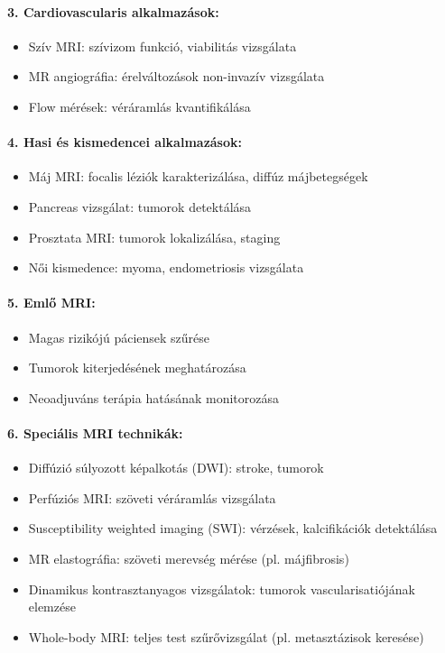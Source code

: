 \documentclass[a4paper,12pt]{article}
\begin{document}
\paragraph{3. Cardiovascularis alkalmazások:} \begin{itemize} \item Szív MRI: szívizom funkció, viabilitás vizsgálata \item MR angiográfia: érelváltozások non-invazív vizsgálata \item Flow mérések: véráramlás kvantifikálása \end{itemize}

\paragraph{4. Hasi és kismedencei alkalmazások:} \begin{itemize} \item Máj MRI: focalis léziók karakterizálása, diffúz májbetegségek \item Pancreas vizsgálat: tumorok detektálása \item Prosztata MRI: tumorok lokalizálása, staging \item Női kismedence: myoma, endometriosis vizsgálata \end{itemize}

\paragraph{5. Emlő MRI:} \begin{itemize} \item Magas rizikójú páciensek szűrése \item Tumorok kiterjedésének meghatározása \item Neoadjuváns terápia hatásának monitorozása \end{itemize}

\paragraph{6. Speciális MRI technikák:} \begin{itemize} \item Diffúzió súlyozott képalkotás (DWI): stroke, tumorok \item Perfúziós MRI: szöveti véráramlás vizsgálata \item Susceptibility weighted imaging (SWI): vérzések, kalcifikációk detektálása \item MR elastográfia: szöveti merevség mérése (pl. májfibrosis) \item Dinamikus kontrasztanyagos vizsgálatok: tumorok vascularisatiójának elemzése \item Whole-body MRI: teljes test szűrővizsgálat (pl. metasztázisok keresése) \end{itemize}
\end{document}
